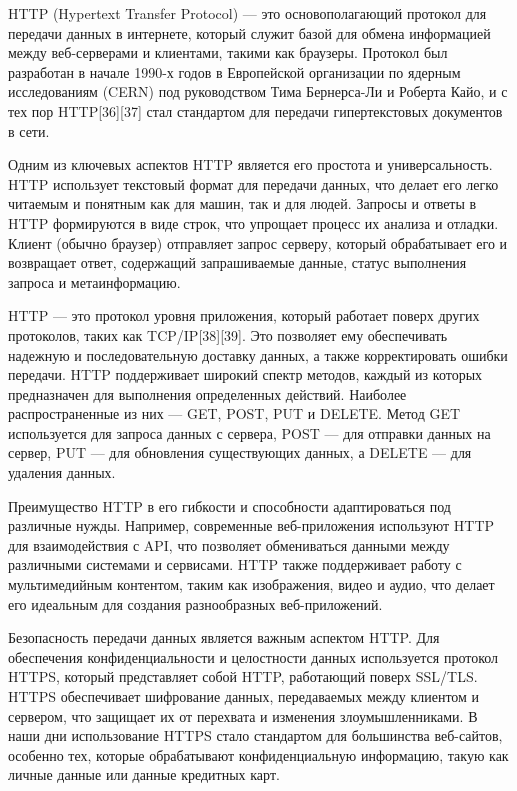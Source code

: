 HTTP (Hypertext Transfer Protocol) — это основополагающий протокол для передачи данных в интернете, который служит базой для обмена информацией между веб-серверами и клиентами, такими как браузеры. Протокол был разработан в начале 1990-х годов в Европейской организации по ядерным исследованиям (CERN) под руководством Тима Бернерса-Ли и Роберта Кайо, и с тех пор HTTP{[36]}{[37]} стал стандартом для передачи гипертекстовых документов в сети.

Одним из ключевых аспектов HTTP является его простота и универсальность. HTTP использует текстовый формат для передачи данных, что делает его легко читаемым и понятным как для машин, так и для людей. Запросы и ответы в HTTP формируются в виде строк, что упрощает процесс их анализа и отладки. Клиент (обычно браузер) отправляет запрос серверу, который обрабатывает его и возвращает ответ, содержащий запрашиваемые данные, статус выполнения запроса и метаинформацию.

HTTP — это протокол уровня приложения, который работает поверх других протоколов, таких как TCP/IP{[38]}{[39]}. Это позволяет ему обеспечивать надежную и последовательную доставку данных, а также корректировать ошибки передачи. HTTP поддерживает широкий спектр методов, каждый из которых предназначен для выполнения определенных действий. Наиболее распространенные из них — GET, POST, PUT и DELETE. Метод GET используется для запроса данных с сервера, POST — для отправки данных на сервер, PUT — для обновления существующих данных, а DELETE — для удаления данных.

Преимущество HTTP в его гибкости и способности адаптироваться под различные нужды. Например, современные веб-приложения используют HTTP для взаимодействия с API, что позволяет обмениваться данными между различными системами и сервисами. HTTP также поддерживает работу с мультимедийным контентом, таким как изображения, видео и аудио, что делает его идеальным для создания разнообразных веб-приложений.

Безопасность передачи данных является важным аспектом HTTP. Для обеспечения конфиденциальности и целостности данных используется протокол HTTPS, который представляет собой HTTP, работающий поверх SSL/TLS. HTTPS обеспечивает шифрование данных, передаваемых между клиентом и сервером, что защищает их от перехвата и изменения злоумышленниками. В наши дни использование HTTPS стало стандартом для большинства веб-сайтов, особенно тех, которые обрабатывают конфиденциальную информацию, такую как личные данные или данные кредитных карт.


